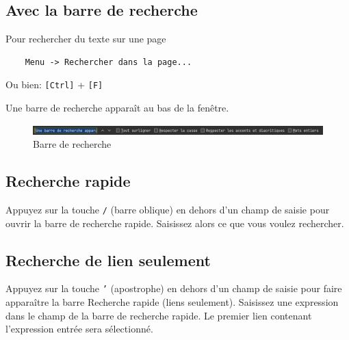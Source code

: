 \documentclass[a4paper,11pt]{book}
\begin{document}
\subsection*{Avec la barre de recherche}
Pour rechercher du texte sur une page
\begin{verbatim}
    Menu -> Rechercher dans la page...
\end{verbatim}
\medskip

Ou bien: \texttt{[Ctrl]} + \texttt{[F]}
\medskip

Une barre de recherche apparaît au bas de la fenêtre.
\begin{figure}[!h]
\begin{center}
\includegraphics[scale=0.3]{IMG/005--Barre_recherche.png}
\caption{Barre de recherche}
\end{center}
\end{figure}
\medskip

\subsection*{Recherche rapide}
Appuyez sur la touche \texttt{/} (barre oblique) en dehors d’un champ de saisie pour ouvrir la barre de recherche rapide. Saisissez alors ce que vous voulez rechercher.
\medskip

\subsection*{Recherche de lien seulement}
Appuyez sur la touche \texttt{'} (apostrophe) en dehors d’un champ de saisie pour faire apparaître la barre \og Recherche rapide (liens seulement)\fg{}. Saisissez une expression dans le champ de la barre de recherche rapide. Le premier lien contenant l’expression entrée sera sélectionné. 
\medskip
\end{document}

